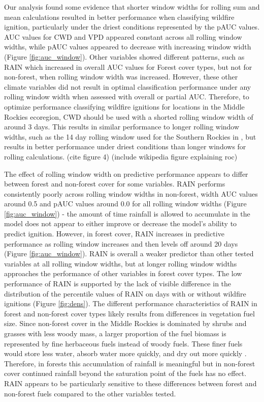 \documentclass[11p]{article}
\begin{document}
Our analysis found some evidence that shorter window widths for rolling sum and mean calculations resulted in better performance when classifying wildfire ignition, particularly under the driest conditions represented by the pAUC values. AUC values for CWD and VPD appeared constant across all rolling window widths, while pAUC values appeared to decrease with increasing window width (Figure \ref{fig:auc_window}). Other variables showed different patterns, such as RAIN which increased in overall AUC values for Forest cover types, but not for non-forest, when rolling window width was increased. However, these other climate variables did not result in optimal classification performance under any rolling window width when assessed with overall or partial AUC. Therefore, to optimize performance classifying wildfire ignitions for locations in the Middle Rockies ecoregion, CWD should be used with a shorted rolling window width of around 3 days. This results in similar performance to longer rolling window widths, such as the 14 day rolling window used for the Southern Rockies in  \citet{thomaWaterBalanceIndicator2020}, but results in better performance under driest conditions than longer windows for rolling calculations. (cite figure 4) (include wikipedia figure explaining roc)

The effect of rolling window width on predictive performance appears to differ between forest and non-forest cover for some variables. RAIN performs consistently poorly across rolling window widths in non-forest, width AUC values around 0.5 and pAUC values around 0.0 for all rolling window widths (Figure \ref{fig:auc_window}) - the amount of time rainfall is allowed to accumulate in the model does not appear to either improve or decrease the model's ability to predict ignition. However, in forest cover, RAIN increases in predictive performance as rolling window increases and then levels off around 20 days (Figure \ref{fig:auc_window}). RAIN is overall a weaker predictor than other tested variables at all rolling window widths, but at longer rolling window widths approaches the performance of other variables in forest cover types. The low performance of RAIN is supported by the lack of visible difference in the distribution of the percentile values of RAIN on days with or without wildfire ignitions (Figure \ref{fig:dens}). The different performance characteristics of RAIN in forest and non-forest cover types likely results from differences in vegetation fuel size. Since non-forest cover in the Middle Rockies is dominated by shrubs and grasses with less woody mass, a larger proportion of the fuel biomass is represented by fine herbaceous fuels instead of woody fuels. These finer fuels would store less water, absorb water more quickly, and dry out more quickly \citep{vineyReviewFineFuel1991}. Therefore, in forests this accumulation of rainfall is meaningful but in non-forest cover continued rainfall beyond the saturation point of the fuels has no effect. RAIN appears to be particularly sensitive to these differences between forest and non-forest fuels compared to the other variables tested.
\end{document}
